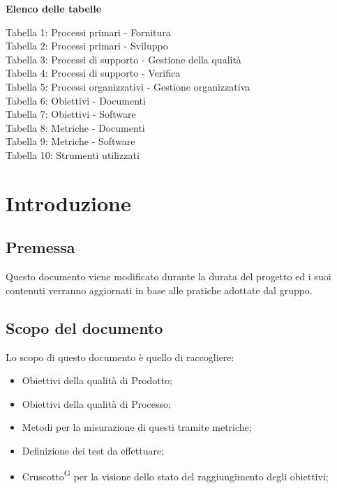 \documentclass[5pt]{article}
\begin{document}
	\begin{flushleft}
		\textbf{\Large Elenco delle tabelle}
		\begin{spacing}{1.5}
			
			Tabella 1: Processi primari - Fornitura \\
			Tabella 2: Processi primari - Sviluppo \\
			Tabella 3: Processi di supporto - Gestione della qualità \\
			Tabella 4: Processi di supporto - Verifica \\
			Tabella 5: Processi organizzativi - Gestione organizzativa \\
			Tabella 6: Obiettivi - Documenti \\
			Tabella 7: Obiettivi - Software \\
			Tabella 8: Metriche - Documenti \\
			Tabella 9: Metriche - Software \\
			Tabella 10: Strumenti utilizzati
		\end{spacing}
	\end{flushleft}
	
	\pagebreak
	
	\section{Introduzione}
	
	\subsection{Premessa}
	Questo documento viene modificato durante la durata del progetto ed i suoi contenuti verranno aggiornati in base alle pratiche adottate dal gruppo.
	
	\subsection{Scopo del documento}
	Lo scopo di questo documento è quello di raccogliere:
	\begin{itemize}
		\item Obiettivi della qualità di Prodotto;
		\item Obiettivi della qualità di Processo;
		\item Metodi per la misurazione di questi tramite metriche;
		\item Definizione dei test da effettuare;
		\item Cruscotto\textsuperscript{G} per la visione dello stato del raggiungimento degli obiettivi;
	\end{itemize}
	
\end{document}
